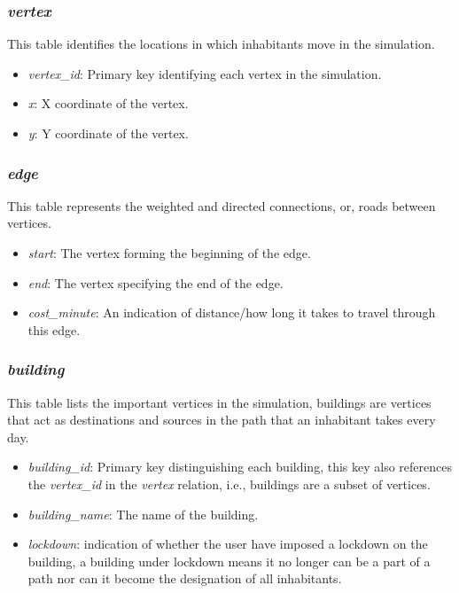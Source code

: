 \documentclass{article}
\begin{document}
\subsubsection{\textit{vertex}}
This table identifies the locations in which inhabitants move in the simulation.

\begin{itemize}
    \item \textit{vertex\_id}: Primary key identifying each vertex in the simulation.
    \item \textit{x}: X coordinate of the vertex.
    \item \textit{y}: Y coordinate of the vertex.
\end{itemize}

\subsubsection{\textit{edge}}
This table represents the weighted and directed connections, or, roads between vertices.

\begin{itemize}
    \item \textit{start}: The vertex forming the beginning of the edge.
    \item \textit{end}: The vertex specifying the end of the edge.
    \item \textit{cost\_minute}: An indication of distance/how long it takes to travel through this edge.
\end{itemize}

\subsubsection{\textit{building}}
This table lists the important vertices in the simulation, buildings are vertices that act as destinations and sources in the path that an inhabitant takes every day.

\begin{itemize}
    \item \textit{building\_id}: Primary key distinguishing each building, this key also references the \textit{vertex\_id} in the \textit{vertex} relation, i.e., buildings are a subset of vertices.
    \item \textit{building\_name}: The name of the building.
    \item \textit{lockdown}: indication of whether the user have imposed a lockdown on the building, a building under lockdown means it no longer can be a part of a path nor can it become the designation of all inhabitants.
\end{itemize}
\end{document}
